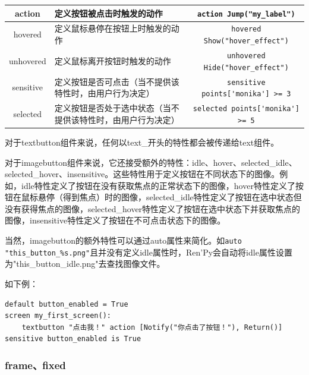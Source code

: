 \documentclass[../../Main.tex]{subfiles}
\begin{document}
\begin{center}
    \tabletail{\hline}
    \tablelasttail{\hline}
    \begin{supertabular}{|c|p{6cm}|c|}
        \hline
        action & 定义按钮被点击时触发的动作 & \verb|action Jump("my_label")|\\
        \hline
        hovered & 定义鼠标悬停在按钮上时触发的动作 & \verb|hovered Show("hover_effect")|\\
        \hline
        unhovered & 定义鼠标离开按钮时触发的动作 & \verb|unhovered Hide("hover_effect")|\\
        \hline
        sensitive & 定义按钮是否可点击（当不提供该特性时，由用户行为决定） & \verb|sensitive points['monika'] >= 3|\\
        \hline
        selected & 定义按钮是否处于选中状态（当不提供该特性时，由用户行为决定） & \verb|selected points['monika'] >= 5|\\
    \end{supertabular}
\end{center}

对于textbutton组件来说，任何以text\_开头的特性都会被传递给text组件。

对于imagebutton组件来说，它还接受额外的特性：idle、hover、selected\_idle、selected\_hover、insensitive。这些特性用于定义按钮在不同状态下的图像。例如，idle特性定义了按钮在没有获取焦点的正常状态下的图像，hover特性定义了按钮在鼠标悬停（得到焦点）时的图像，selected\_idle特性定义了按钮在选中状态但没有获得焦点的图像，selected\_hover特性定义了按钮在选中状态下并获取焦点的图像，insensitive特性定义了按钮在不可点击状态下的图像。

当然，imagebutton的额外特性可以通过auto属性来简化。如\verb|auto "this_button_%s.png"|且并没有定义idle属性时，Ren'Py会自动将idle属性设置为"this\_button\_idle.png"去查找图像文件。

如下例：
\begin{lstlisting}
default button_enabled = True
screen my_first_screen():
    textbutton "点击我！" action [Notify("你点击了按钮！"), Return()] sensitive button_enabled is True
\end{lstlisting}

\subsubsection{frame、fixed}
\end{document}
